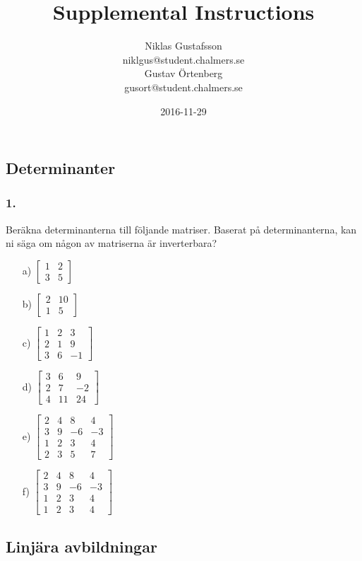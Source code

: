 \documentclass{article}
\title{Supplemental Instructions}
\author{Niklas Gustafsson \\ 
		\small{niklgus@student.chalmers.se} \\
		Gustav Örtenberg \\ 
		\small{gusort@student.chalmers.se}
}
\date{
      2016-11-29
     }
\begin{document}
\maketitle

\subsection*{Determinanter}
\subsubsection*{1.}
Beräkna determinanterna till följande matriser. Baserat på determinanterna, kan ni säga om någon av matriserna är inverterbara?
\begin{itemize}
	\item[a) ] $\begin{bmatrix}1 & 2 \\ 3 & 5\end{bmatrix}$
	\item[b) ] $\begin{bmatrix}2 & 10 \\ 1 & 5\end{bmatrix}$
	\item[c) ] $\begin{bmatrix}1 & 2 & 3\\ 2 & 1 & 9 \\ 3 & 6 & -1\end{bmatrix}$
	\item[d) ] $\begin{bmatrix}3 & 6 & 9\\ 2 & 7 & -2 \\ 4 & 11 & 24\end{bmatrix}$
	\item[e) ] $\begin{bmatrix} 2 & 4 & 8 & 4\\ 3 & 9 & -6 & -3 \\ 1 & 2 & 3 & 4 \\ 2 & 3 & 5 & 7 \end{bmatrix}$
	\item[f) ] $\begin{bmatrix} 2 & 4 & 8 & 4\\ 3 & 9 & -6 & -3 \\ 1 & 2 & 3 & 4 \\ 1 & 2 & 3 & 4 \end{bmatrix}$
\end{itemize}

\subsection*{Linjära avbildningar}
\end{document}
